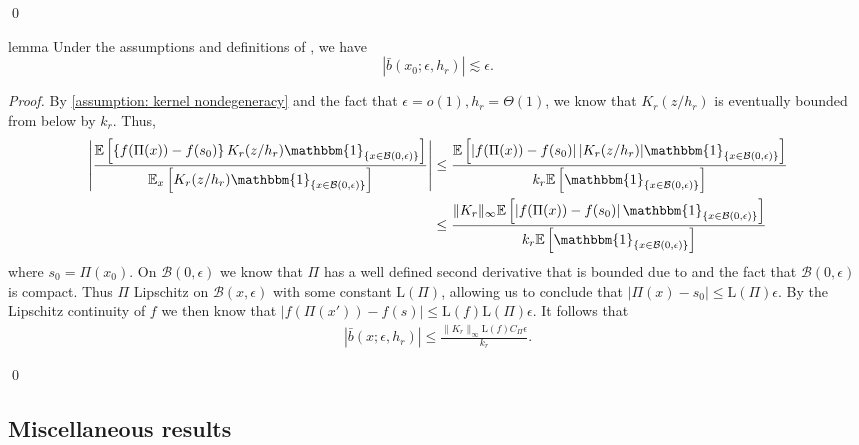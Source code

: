 \documentclass[11pt]{article}
\begin{document}
\qed{}

\begin{restatable}{lemma}{}\label{lemma: bias bound}
    Under the assumptions and definitions of , we have
    \begin{equation}
        |\bar{b}(x_0;\epsilon, h_r)| \lesssim \epsilon.
    \end{equation}
\end{restatable}
\noindent \textit{Proof.} By \cref{assumption: kernel nondegeneracy} and the fact that $\epsilon = o(1), h_r = \Theta(1)$, we know that $K_r(z/h_r)$ is eventually bounded from below by $k_r$. Thus,
\begin{align*}
    \left|\frac{\mathbb{E}\left[\left\{f(\Pi(x)) - f(s_0)\right\}K_r(z/h_r)\mathbbm{1}_{\{x\in \mathcal{B}(0, \epsilon)\}}\right]}{\mathbb{E}_{x}\left[K_r(z/h_r)\mathbbm{1}_{\{x\in \mathcal{B}(0, \epsilon)\}}\right]}\right| &\leq \frac{\mathbb{E}\left[\left|f(\Pi(x)) - f(s_0)\right||K_r(z/h_r)|\mathbbm{1}_{\{x\in \mathcal{B}(0, \epsilon)\}}\right]}{k_r\mathbb{E}\left[\mathbbm{1}_{\{x\in \mathcal{B}(0, \epsilon)\}}\right]} \\
    &\leq \frac{\|K_r\|_{\infty}\mathbb{E}\left[\left|f(\Pi(x)) - f(s_0)\right|\mathbbm{1}_{\{x\in \mathcal{B}(0, \epsilon)\}}\right]}{k_r\mathbb{E}\left[\mathbbm{1}_{\{x\in \mathcal{B}(0, \epsilon)\}}\right]}
\end{align*}
where $s_0 = \Pi(x_0)$. On $\mathcal{B}(0, \epsilon)$ we know that $\Pi$ has a well defined second derivative that is bounded due to  and the fact that $\mathcal{B}(0, \epsilon)$ is compact. Thus $\Pi$ Lipschitz on $\mathcal{B}(x, \epsilon)$ with some constant $\text{L}(\Pi)$, allowing us to conclude that $|\Pi(x) - s_0| \leq \text{L}(\Pi)\epsilon.$ By the Lipschitz continuity of $f$ we then know that $|f(\Pi(x')) - f(s)| \leq \text{L}(f)\text{L}(\Pi)\epsilon$. It follows that
\begin{align}
    |\bar{b}(x; \epsilon, h_r)|\leq \frac{\|K_r\|_{\infty}\text{L}(f)C_{\Pi}\epsilon}{k_r}.
\end{align}

\qed{}


\subsection{Miscellaneous results}
\end{document}
